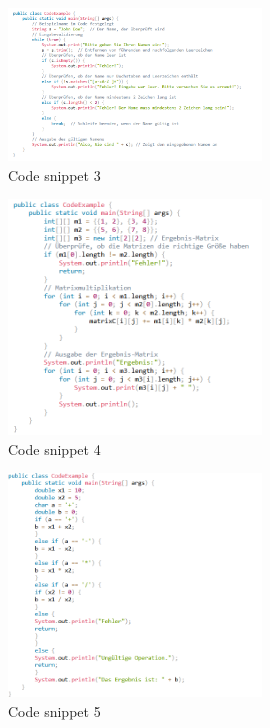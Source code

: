 \begin{figure}[H]
    \centering
    \includegraphics[width=0.6\textwidth]{figures/name.png}
    \caption{Code snippet 3}
    \label{fig:appendix-example3}
\end{figure}


\begin{figure}[H]
    \centering
    \includegraphics[width=0.6\textwidth]{figures/m.png}
    \caption{Code snippet 4}
    \label{fig:appendix-example4}
\end{figure}

\begin{figure}[H]
    \centering
    \includegraphics[width=0.6\textwidth]{figures/rechner.png}
    \caption{Code snippet 5}
    \label{fig:appendix-example5}
\end{figure}


